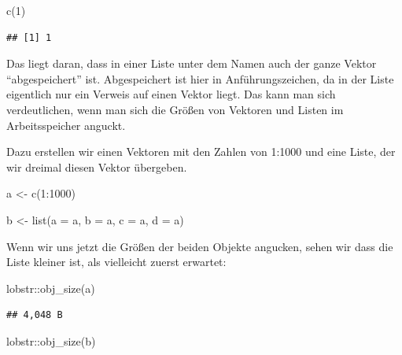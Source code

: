 \documentclass[
]{book}
\newenvironment{Shaded}{\begin{snugshade}}{\end{snugshade}}
\newcommand{\AttributeTok}[1]{\textcolor[rgb]{0.77,0.63,0.00}{#1}}
\newcommand{\DecValTok}[1]{\textcolor[rgb]{0.00,0.00,0.81}{#1}}
\newcommand{\FunctionTok}[1]{\textcolor[rgb]{0.00,0.00,0.00}{#1}}
\newcommand{\NormalTok}[1]{#1}
\newcommand{\OtherTok}[1]{\textcolor[rgb]{0.56,0.35,0.01}{#1}}
\newcommand{\SpecialCharTok}[1]{\textcolor[rgb]{0.00,0.00,0.00}{#1}}
\begin{document}
\begin{Shaded}
\begin{Highlighting}[]
\FunctionTok{c}\NormalTok{(}\DecValTok{1}\NormalTok{)}
\end{Highlighting}
\end{Shaded}

\begin{verbatim}
## [1] 1
\end{verbatim}

Das liegt daran, dass in einer Liste unter dem Namen auch der ganze Vektor ``abgespeichert'' ist. Abgespeichert ist hier in Anführungszeichen, da in der Liste eigentlich nur ein Verweis auf einen Vektor liegt. Das kann man sich verdeutlichen, wenn man sich die Größen von Vektoren und Listen im Arbeitsspeicher anguckt.

Dazu erstellen wir einen Vektoren mit den Zahlen von 1:1000 und eine Liste, der wir dreimal diesen Vektor übergeben.

\begin{Shaded}
\begin{Highlighting}[]
\NormalTok{a }\OtherTok{\textless{}{-}} \FunctionTok{c}\NormalTok{(}\DecValTok{1}\SpecialCharTok{:}\DecValTok{1000}\NormalTok{)}

\NormalTok{b }\OtherTok{\textless{}{-}} \FunctionTok{list}\NormalTok{(}\AttributeTok{a =}\NormalTok{ a, }\AttributeTok{b =}\NormalTok{ a, }\AttributeTok{c =}\NormalTok{ a, }\AttributeTok{d =}\NormalTok{ a)}
\end{Highlighting}
\end{Shaded}

Wenn wir uns jetzt die Größen der beiden Objekte angucken, sehen wir dass die Liste kleiner ist, als vielleicht zuerst erwartet:

\begin{Shaded}
\begin{Highlighting}[]
\NormalTok{lobstr}\SpecialCharTok{::}\FunctionTok{obj\_size}\NormalTok{(a)}
\end{Highlighting}
\end{Shaded}

\begin{verbatim}
## 4,048 B
\end{verbatim}

\begin{Shaded}
\begin{Highlighting}[]
\NormalTok{lobstr}\SpecialCharTok{::}\FunctionTok{obj\_size}\NormalTok{(b)}
\end{Highlighting}
\end{Shaded}
\end{document}
